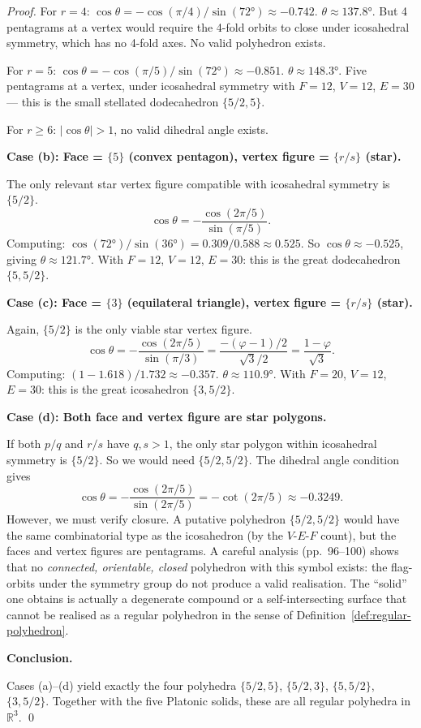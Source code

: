 \begin{proof}
For $r = 4$: $\cos\theta = -\cos(\pi/4)/\sin(72°) \approx -0.742$.
$\theta \approx 137.8°$.  But 4 pentagrams at a vertex would
require the 4-fold orbits to close under icosahedral symmetry,
which has no 4-fold axes.  No valid polyhedron exists.

For $r = 5$: $\cos\theta = -\cos(\pi/5)/\sin(72°) \approx -0.851$.
$\theta \approx 148.3°$.  Five pentagrams at a vertex, under
icosahedral symmetry with $F = 12$, $V = 12$, $E = 30$ —
this is the small stellated dodecahedron $\{5/2,5\}$. \checkmark

For $r \geq 6$: $|\cos\theta| > 1$, no valid dihedral angle
exists.

\medskip
\noindent\textbf{Case (b): Face = $\{5\}$ (convex pentagon), vertex figure = $\{r/s\}$ (star).}

The only relevant star vertex figure compatible with
icosahedral symmetry is $\{5/2\}$.
\[
  \cos\theta = -\frac{\cos(2\pi/5)}{\sin(\pi/5)}.
\]
Computing: $\cos(72°)/\sin(36°) = 0.309/0.588 \approx 0.525$.
So $\cos\theta \approx -0.525$, giving $\theta \approx 121.7°$.
With $F=12$, $V=12$, $E=30$: this is the great dodecahedron
$\{5,5/2\}$. \checkmark

\medskip
\noindent\textbf{Case (c): Face = $\{3\}$ (equilateral triangle), vertex figure = $\{r/s\}$ (star).}

Again, $\{5/2\}$ is the only viable star vertex figure.
\[
  \cos\theta = -\frac{\cos(2\pi/5)}{\sin(\pi/3)} = \frac{-(\varphi-1)/2}{\sqrt{3}/2} = \frac{1-\varphi}{\sqrt{3}}.
\]
Computing: $(1-1.618)/1.732 \approx -0.357$.
$\theta \approx 110.9°$.
With $F=20$, $V=12$, $E=30$: this is the great icosahedron
$\{3,5/2\}$. \checkmark

\medskip
\noindent\textbf{Case (d): Both face and vertex figure are star polygons.}

If both $p/q$ and $r/s$ have $q, s > 1$, the only star
polygon within icosahedral symmetry is $\{5/2\}$.  So we
would need $\{5/2, 5/2\}$.  The dihedral angle condition gives
\[
  \cos\theta = -\frac{\cos(2\pi/5)}{\sin(2\pi/5)} = -\cot(2\pi/5) \approx -0.3249.
\]
However, we must verify closure.  A putative polyhedron
$\{5/2,5/2\}$ would have the same combinatorial type as the
icosahedron (by the $V$-$E$-$F$ count), but the faces and
vertex figures are pentagrams.  A careful analysis
\cite{coxeter_regular_polytopes} (pp.~96--100) shows that no
\emph{connected, orientable, closed} polyhedron with this
symbol exists: the flag-orbits under the symmetry group do not
produce a valid realisation.  The ``solid'' one obtains is
actually a degenerate compound or a self-intersecting surface
that cannot be realised as a regular polyhedron in the sense of
Definition~\ref{def:regular-polyhedron}.

\medskip
\noindent\textbf{Conclusion.}

Cases (a)–(d) yield exactly the four polyhedra
$\{5/2,5\}$, $\{5/2,3\}$, $\{5,5/2\}$, $\{3,5/2\}$.
Together with the five Platonic solids, these are all regular
polyhedra in $\mathbb{R}^3$.
\qed
\end{proof}


